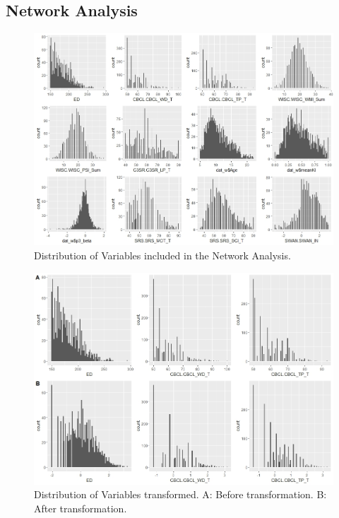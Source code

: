 \subsection*{Network Analysis}
\begin{figure}[H]
    \centering
    \includegraphics[width=0.8\linewidth]{Subfigures/Expl_dist_pre_trans.jpeg}
    \caption[]{Distribution of Variables included in the Network Analysis.}
    \label{fig:distall}
\end{figure}


\begin{figure}[H]
    \centering
    \includegraphics[width=0.6\linewidth]{Subfigures/Posttransform.jpeg}
    \caption[]{Distribution of Variables transformed. A: Before transformation. B: After transformation.}
    \label{fig:distaftert}
\end{figure}

